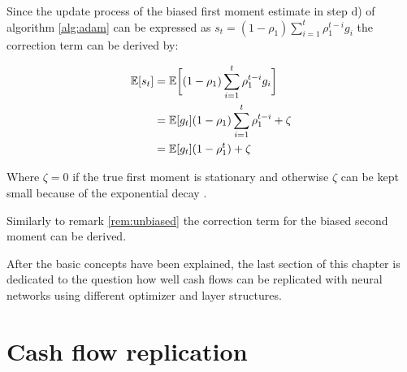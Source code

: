 \begin{remark}\label{rem:unbiased}
	Since the update process of the biased first moment estimate in step d) of algorithm \ref{alg:adam} can be expressed as $s_t = (1 - \rho_1) \sum_{i = 1}^t \rho_1^{t-i} g_i$ the correction term can be derived by:
	
	\begin{align*}
		\mathbb{E}[s_t] &= \mathbb{E} \bigg[ (1 - \rho_1) \sum_{i = 1}^t \rho_1^{t-i} g_i \bigg] \\
				&= \mathbb{E}[g_t] (1 - \rho_1)  \sum_{i = 1}^t \rho_1^{t-i} + \zeta \\
				&= \mathbb{E}[g_t] (1 - \rho_1^t) + \zeta
	\end{align*}
	
	Where $\zeta = 0 $ if the true first moment is stationary and otherwise $\zeta$ can be kept small because of the exponential decay \cite{kingma2014adam}.
\end{remark}

\begin{remark}
	Similarly to remark \ref{rem:unbiased} the correction term for the biased second moment can be derived.
\end{remark}

After the basic concepts have been explained, the last section of this chapter is dedicated to the question how well cash flows can be replicated with neural networks using different optimizer and layer structures. 


\section{Cash flow replication}








